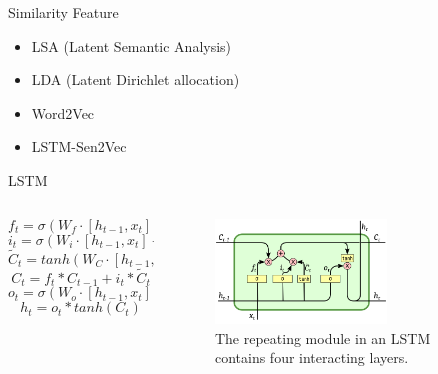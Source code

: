 \documentclass{beamer}
\begin{document}
    \begin{frame}{Similarity Feature}
      \begin{itemize}
        \item LSA (Latent Semantic Analysis)
        \item LDA (Latent Dirichlet allocation)
        \item Word2Vec
        \item LSTM-Sen2Vec
      \end{itemize}
    \end{frame}

    \begin{frame}{LSTM}
      \begin{columns}
      \begin{column}[t]{0.6\textwidth}
        \begin{equation}
           f_t = \sigma(W_f \cdot [h_{t-1}, x_t] + b_f)
        \end{equation}
        \begin{equation}
           i_t = \sigma(W_i \cdot [h_{t-1}, x_t] + b_i)
        \end{equation}
        \begin{equation}
           \tilde{C}_t = tanh(W_C \cdot [h_{t-1}, x_t] + b_C) 
        \end{equation}
        \begin{equation}
           C_t = f_t * C_{t-1} + i_t * \tilde{C}_t
        \end{equation}
        \begin{equation}
           o_t = \sigma(W_o \cdot [h_{t-1}, x_t] + b_o)
        \end{equation}
        \begin{equation}
           h_t = o_t * tanh(C_t)
        \end{equation}
      \end{column}

      \begin{column}[t]{0.4\textwidth}
        \begin{figure}
        \includegraphics[width=1.8in,height=1.1in]{lstm2.png}
        \caption{The repeating module in an LSTM contains four interacting layers.}
        \end{figure}
      \end{column}

      \end{columns}
      
    \end{frame}
\end{document}

